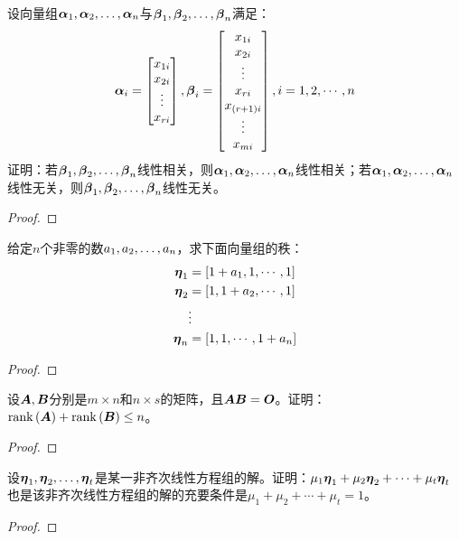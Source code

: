 \begin{problem}\label{problem-2.34}
设向量组\(\enums{\vecal}{n}\)与\(\enums{\vecbeta}{n}\)满足：
\begin{equation*}
    \vecal_i=\begin{bmatrix}x_{1i}\\x_{2i}\\\vdots\\x_{ri}\end{bmatrix},
    \vecbeta_i=\begin{bmatrix}x_{1i}\\x_{2i}\\\vdots\\x_{ri}\\x_{\spar{r+1}i}\\\vdots\\x_{mi}\end{bmatrix},
    i=1,2,\cdots,n
\end{equation*}
证明：若\(\enums{\vecbeta}{n}\)线性相关，则\(\enums{\vecal}{n}\)线性相关；若\(\enums{\vecal}{n}\)线性无关，则\(\enums{\vecbeta}{n}\)线性无关。
\end{problem}
\begin{proof}
\end{proof}

\begin{problem}\label{problem-2.35}
给定\(n\)个非零的数\(\enums{a}{n}\)，求下面向量组的秩：
\begin{align*}
    \veceta_1 & =\mat{1+a_1,1,\cdots,1} \\
    \veceta_2 & =\mat{1,1+a_2,\cdots,1} \\
              & \vdots                  \\
    \veceta_n & =\mat{1,1,\cdots,1+a_n}
\end{align*}
\end{problem}
\begin{proof}
\end{proof}

\begin{problem}\label{problem-2.36}
设\(\mata,\matb\)分别是\(m\times n\)和\(n\times s\)的矩阵，且\(\mata\matb=\mato\)。证明：\(\rank{\mata}+\rank{\matb}\le n\)。
\end{problem}
\begin{proof}

\end{proof}

\begin{problem}\label{problem-2.37}
设\(\enums{\veceta}{t}\)是某一非齐次线性方程组的解。证明：\(\mu_1\veceta_1+\mu_2\veceta_2+\cdots+\mu_t\veceta_t\)也是该非齐次线性方程组的解的充要条件是\(\mu_1+\mu_2+\cdots+\mu_t=1\)。
\end{problem}
\begin{proof}
\end{proof}

